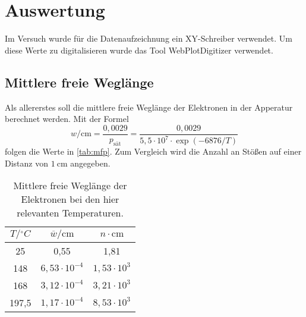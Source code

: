 \section{Auswertung}
\label{sec:Auswertung}
Im Versuch wurde für die Datenaufzeichnung ein XY-Schreiber verwendet. Um diese Werte zu
digitalisieren wurde das Tool WebPlotDigitizer \cite{Rohatgi2020} verwendet.

\subsection{Mittlere freie Weglänge}
\label{sec:Mittlere freie Weglänge}
Als allererstes soll die mittlere freie Weglänge der Elektronen in der Apperatur berechnet
werden. Mit der Formel
\[
	w / \si{\centi\meter} = \frac{0,0029}{p_\text{sät}} = \frac{0,0029}{5,5 \cdot 10^7
	\cdot \exp(-6876 / T)}
\]
folgen die Werte in \autoref{tab:mfp}. Zum Vergleich wird die Anzahl an Stößen auf einer
Distanz von $\SI{1}{\centi\meter}$ angegeben.
\begin{table}
	\centering
	\caption{Mittlere freie Weglänge der Elektronen bei den hier relevanten
	Temperaturen.}
	\label{tab:mfp}
	\begin{tabular}{c c c}
		\toprule
		$T / \si{^\circ C}$ & $\overline{w} / \si{\centi\meter}$ & $n \cdot
		\si{\centi\meter}$ \\
		\midrule
		25    & 0,55 & 1,81 \\
		148   & $6,53 \cdot 10^{-4}$ & $1,53 \cdot 10^{3}$ \\
		168   & $3,12 \cdot 10^{-4}$ & $3,21 \cdot 10^{3}$ \\
		197,5 & $1,17 \cdot 10^{-4}$ & $8,53 \cdot 10^{3}$ \\
		\bottomrule
	\end{tabular}
\end{table}

